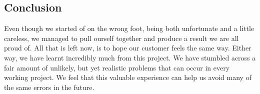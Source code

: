  
\subsection{Conclusion}

Even though we started of on the wrong foot, being both unfortunate and a little careless, we managed to pull ourself together and produce a result we are all proud of. All that is left now, is to hope our customer feels the same way. Either way, we have learnt incredibly much from this project. We have stumbled across a fair amount of unlikely, but yet realistic problems that can occur in every working project. We feel that this valuable experience can help us avoid many of the same errors in the future.